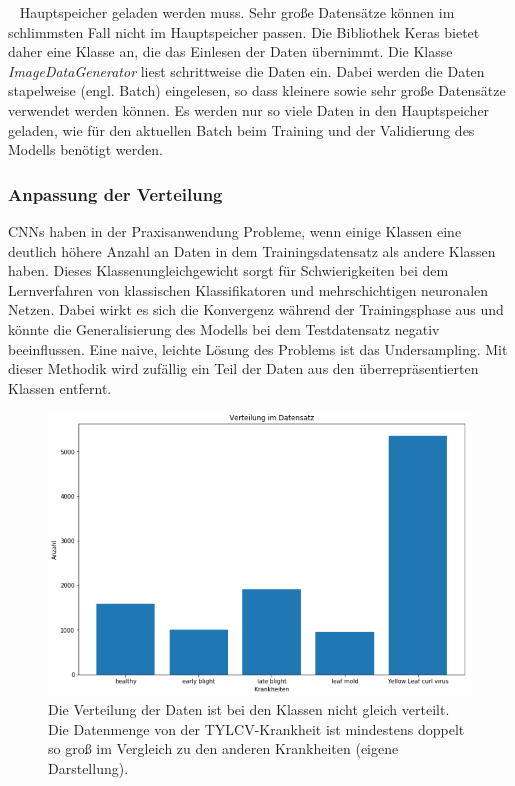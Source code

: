 \newpage~\newline
Hauptspeicher geladen werden muss. Sehr große Datensätze können im schlimmsten Fall nicht im Hauptspeicher passen. Die Bibliothek Keras bietet daher eine Klasse an, die das Einlesen der Daten übernimmt. Die Klasse \textit{ImageDataGenerator}\cite{flowfrom} liest schrittweise die Daten ein. Dabei werden die Daten stapelweise (engl. Batch) eingelesen, so dass kleinere sowie sehr große Datensätze verwendet werden können. Es werden nur so viele Daten in den Hauptspeicher geladen, wie für den aktuellen Batch beim Training und der Validierung des Modells benötigt werden.

\subsubsection{Anpassung der Verteilung}

CNNs haben in der Praxisanwendung Probleme, wenn einige Klassen eine deutlich höhere Anzahl an Daten in dem Trainingsdatensatz als andere Klassen haben. Dieses Klassenungleichgewicht sorgt für Schwierigkeiten bei dem Lernverfahren von klassischen Klassifikatoren und mehrschichtigen neuronalen Netzen. Dabei wirkt es sich die Konvergenz während der Trainingsphase aus und könnte die Generalisierung des Modells bei dem Testdatensatz negativ beeinflussen. Eine naive, leichte Lösung des Problems ist das Undersampling. Mit dieser Methodik wird zufällig ein Teil der Daten aus den überrepräsentierten Klassen entfernt\cite{papernn}.

\begin{figure}[h!]
	\centering
	\includegraphics[width=\textwidth]{bilder/original_distribution.PNG}
	\caption{Die Verteilung der Daten ist bei den Klassen nicht gleich verteilt. Die Datenmenge von der TYLCV-Krankheit ist mindestens doppelt so groß im Vergleich zu den anderen Krankheiten (eigene Darstellung).}
	\label{original_distribution}
\end{figure}


